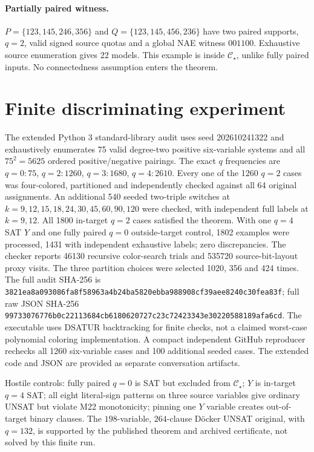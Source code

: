 \documentclass[11pt]{article}
\begin{document}
\paragraph{Partially paired witness.}
$P=\{123,145,246,356\}$ and
$Q=\{123,145,456,236\}$
have two paired supports, $q=2$,
valid signed source quotas and
a global NAE witness $001100$.
Exhaustive source enumeration gives
22 models. This example is inside
$\mathcal C_\star$, unlike fully paired
inputs. No connectedness assumption
enters the theorem.

\section{Finite discriminating experiment}
The extended Python 3 standard-library audit
uses seed 202610241322 and exhaustively
enumerates 75 valid degree-two positive
six-variable systems and all $75^2=5625$
ordered positive/negative pairings.
The exact $q$ frequencies are
$q=0:75$, $q=2:1260$,
$q=3:1680$, $q=4:2610$.
Every one of the 1260 $q=2$ cases
was four-colored, partitioned and
independently checked against
all 64 original assignments.
An additional 540 seeded two-triple
switches at $k=9,12,15,18,24,30,
45,60,90,120$ were checked, with
independent full labels at $k=9,12$.
All 1800 in-target $q=2$ cases
satisfied the theorem. With one
$q=4$ SAT $Y$ and one fully paired
$q=0$ outside-target control,
1802 examples were processed,
1431 with independent exhaustive
labels; zero discrepancies.
The checker reports 46130 recursive
color-search trials and 535720
source-bit-layout proxy visits.
The three partition choices were
selected 1020, 356 and 424 times.
The full audit SHA-256 is
\texttt{3821ea8a093086fa8f58963a4b24ba5820ebba988908cf39aee8240c30fea83f};
full raw JSON SHA-256
\texttt{99733076776b0c22113684cb6180620727c23c72423343e30220588189afa6cd}.
The executable uses DSATUR backtracking
for finite checks, not a claimed
worst-case polynomial coloring implementation.
A compact independent GitHub reproducer
rechecks all 1260 six-variable cases
and 100 additional seeded cases.
The extended code and JSON are
provided as separate conversation artifacts.

Hostile controls: fully paired $q=0$
is SAT but excluded from $\mathcal C_\star$;
$Y$ is in-target $q=4$ SAT;
all eight literal-sign patterns on
three source variables give ordinary
UNSAT but violate M22 monotonicity;
pinning one $Y$ variable creates
out-of-target binary clauses.
The $198$-variable, $264$-clause
D\"ocker UNSAT original, with $q=132$,
is supported by the published theorem
and archived certificate, not solved
by this finite run.
\end{document}
